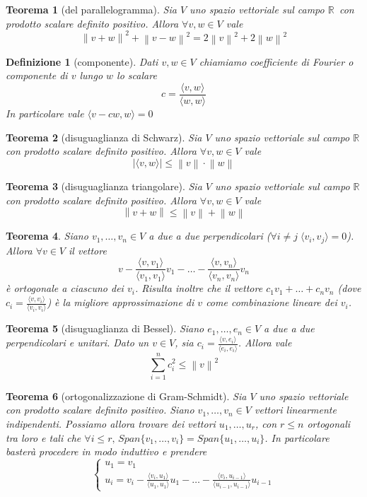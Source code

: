 \documentclass[9pt, a4paper]{article}
\newcommand{\R}{\mathbb{R}}
\newcommand{\letvsR}{Sia $ V $ uno spazio vettoriale sul campo $ \R $}
\newcommand{\scprd}[2]{\langle #1, #2 \rangle}
\newcommand{\norm}[1]{\left\lVert#1\right\rVert}
\theoremstyle{mythm}
\newtheorem{definition}{Definizione}[section]
\newtheorem{thm}{Teorema}[section]
\begin{document}
\begin{thm}[del parallelogramma]
	\letvsR \, con prodotto scalare definito positivo. Allora $ \forall v, w \in V $ vale \[\norm{v + w}^2 + \norm{v - w}^2 = 2\norm{v}^2 + 2\norm{w}^2\]
\end{thm}

\begin{definition}[componente]
	Dati $ v, w \in V $ chiamiamo coefficiente di Fourier o componente di $ v $ lungo $ w $ lo scalare \[c = \frac{\scprd{v}{w}}{\scprd{w}{w}}\] In particolare vale $ \scprd{v - cw}{w} = 0 $
\end{definition}

\begin{thm}[disuguaglianza di Schwarz]
	\letvsR \, con prodotto scalare definito positivo. Allora $ \forall v, w \in V $ vale \[|\scprd{v}{w}| \leq \norm{v} \cdot \norm{w}\]
\end{thm}

\begin{thm}[disuguaglianza triangolare]
	\letvsR \, con prodotto scalare definito positivo. Allora $ \forall v, w \in V $ vale \[\norm{v + w} \leq \norm{v} + \norm{w}\]
\end{thm}

\begin{thm}
	Siano $ v_1, \ldots , v_n \in V $ a due a due perpendicolari ($ \forall i \neq j \; \scprd{v_i}{v_j} = 0 $). Allora $ \forall v \in V $ il vettore \[v - \frac{\scprd{v}{v_1}}{\scprd{v_1}{v_1}}v_1 - \ldots - \frac{\scprd{v}{v_n}}{\scprd{v_n}{v_n}}v_n\] è ortogonale a ciascuno dei $ v_i $. Risulta inoltre che il vettore $ c_1 v_1 + \ldots + c_n v_n $ (dove $ c_i = \frac{\scprd{v}{v_i}}{\scprd{v_i}{v_i}} $) è la migliore approssimazione di $ v $ come combinazione lineare dei $ v_i $.
\end{thm}

\begin{thm}[disuguaglianza di Bessel]
	Siano $ e_1, \ldots , e_n \in V $ a due a due perpendicolari e unitari. Dato un $ v \in V $, sia $ c_i = \frac{\scprd{v}{e_i}}{\scprd{e_i}{e_i}} $. Allora vale \[\sum_{i = 1}^{n}c_i^2 \leq \norm{v}^2\]
\end{thm}

\begin{thm}[ortogonalizzazione di Gram-Schmidt]
	Sia $ V $ uno spazio vettoriale con prodotto scalare definito positivo. Siano $ v_1, \ldots , v_n \in V $ vettori linearmente indipendenti. Possiamo allora trovare dei vettori $ u_1,\ldots, u_r $, con $ r \leq n $ ortogonali tra loro e tali che $ \forall i \leq r, \, Span\{v_1, \ldots, v_i\} = Span \{u_1, \ldots, u_i\} $. In particolare basterà procedere in modo induttivo e prendere
	\[\begin{cases}
	u_1 = v_1 \\
	u_{i} = v_i - \frac{\scprd{v_i}{u_1}}{\scprd{u_1}{u_1}}u_1 - \ldots - \frac{\scprd{v_i}{u_{i-1}}}{\scprd{u_{i-1}}{u_{i-1}}}u_{i-1}
	\end{cases}\]
\end{thm}
\end{document}
